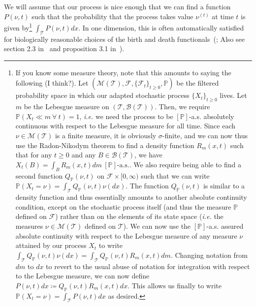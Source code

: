 We will assume that our process is nice enough that we can find a function $P(\nu,t)$ such that the probability that the process takes value $\nu^{(t)}$ at time $t$ is given by\footnote{If you know some measure theory, note that this amounts to saying the following (I think?). Let $(\mathcal{M}(\mathcal{T}), \mathscr{F}, \{\mathscr{F}_t\}_{t\geq 0}, \mathbb{P})$ be the filtered probability space in which our adapted stochastic process $\{X_t\}_{t \geq 0}$ lives. Let $m$ be the Lebesgue measure on $(\mathcal{T},\mathcal{B}(\mathcal{T}))$. Then, we require $\mathbb{P}(X_t \ll m \ \forall \ t) = 1$, \emph{i.e.} we need the process to be $[\mathbb{P}]$-a.s. absolutely continuous with respect to the Lebesgue measure for all time. Since each $\nu \in \mathcal{M}(\mathcal{T})$ is a finite measure, it is obviously $\sigma$-finite, and we can now thus use the Radon-Nikodym theorem to find a density function $R_{m}(x,t)$ such that for any $t \geq 0$ and any $B \in \mathcal{B}(\mathcal{T})$, we have $X_t(B) = \int_B R_{m}(x,t) dm \ [\mathbb{P}]\textrm{-a.s.}$. We also require being able to find a second function $Q_{\mathbb{P}}(\nu,t)$ on $\mathscr{F} \times [0,\infty)$ such that we can write $\mathbb{P}(X_t = \nu) = \int_{\mathcal{T}} Q_{\mathbb{P}}(\nu,t)\nu(dx)$. The function $Q_{\mathbb{P}}(\nu,t)$ is similar to a density function and thus essentially amounts to another absolute continuity condition, except on the stochastic process itself (and thus the measure $\mathbb{P}$ defined on $\mathscr{F}$) rather than on the elements of its state space (\emph{i.e.} the measures $\nu \in \mathcal{M}(\mathcal{T})$ defined on $\mathcal{T}$). We can now use the $[\mathbb{P}]$-a.s. assured absolute continuity with respect to the Lebesgue measure of any measure $\nu$ attained by our process $X_t$ to write $\int_{\mathcal{T}}Q_{\mathbb{P}}(\nu,t)\nu(dx) = \int_{\mathcal{T}}Q_{\mathbb{P}}(\nu,t)R_{m}(x,t)dm$. Changing notation from $dm$ to $dx$ to revert to the usual abuse of notation for integration with respect to the Lebesgue measure, we can now define $P(\nu,t)dx \coloneqq Q_{\mathbb{P}}(\nu,t)R_{m}(x,t)dx$. This allows us finally to write $\mathbb{P}(X_t = \nu) =  \int_{\mathcal{T}}P(\nu,t)dx$ as desired.} $\int_{\mathcal{T}}P(\nu,t)dx$. In one dimension, this is often automatically satisfied for biologically reasonable choices of the birth and death functionals~(\cite{dawson_stochastic_1975,walsh_introduction_1986,konno_stochastic_1988,reimers_one_1989,dawson_stochastic_2000}; Also see section 2.3 in~\cite{etheridge_introduction_2000} and proposition 3.1 in~\cite{champagnat_individual_2008}).

